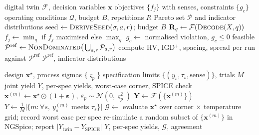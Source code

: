 \begin{algorithm}[!t]
\caption{Robust surrogate-driven multi-objective optimisation}
\label{alg:robust_surrogate_driven_multi_objective_optimisation}
\begin{algorithmic}[1]
\Require digital twin $\mathcal{F}$, decision variables $\mathbf{x}$
\Require objectives $\{f_j\}$ with senses, constraints $\{g_c\}$
\Require operating conditions $\mathcal{Q}$, budget $B$, repetitions $R$
\Ensure Pareto set $\mathcal{P}$ and indicator distributions
        \State seed $\leftarrow \textsc{DeriveSeed}(\sigma, a, r)$; budget $B$ 
                    \State $\mathbf{R}_q \leftarrow \mathcal{F}(\textsc{Decode}(X, q))$
                \EndFor
                \State $f_j \leftarrow \min_q$ if $f_j$ maximised else $\max_q$
                \State $g_c \leftarrow$ normalised violation, $g_c \le 0$ feasible
            \EndFor
        \EndWhile
    \EndFor
    \State $\mathcal{P}^{\mathrm{ref}} \leftarrow \textsc{NonDominated}\big(\bigcup_{a,r}\mathcal{P}_{a,r}\big)$
    \State compute HV, IGD$^+$, spacing, spread per run against $\mathcal{P}^{\mathrm{ref}}$
    \Return $\mathcal{P}^{\mathrm{ref}}$, indicator distributions
\end{algorithmic}
\end{algorithm}


\begin{algorithm}[!t]
\caption{Digital-twin robustness and yield estimation}
\label{alg:digital_twin_robustness_and_yield_estimation}
\begin{algorithmic}[1]
\Require design $\mathbf{x}^\star$, process sigmas $\{\varsigma_p\}$
\Require specification limits $\{(y_s, \tau_s, \text{sense})\}$, trials $M$
\Ensure joint yield $Y$, per-spec yields, worst-case corner, SPICE check
        \State $\mathbf{x}^{(m)} \leftarrow \mathbf{x}^\star \odot (1 + \boldsymbol{\varepsilon}),\ \varepsilon_p\sim\mathcal{N}(0,\varsigma_p^2)$
    \EndFor
    \State $\mathbf{Y} \leftarrow \mathcal{F}(\{\mathbf{x}^{(m)}\})$
    \State $Y \leftarrow \frac{1}{M}\big|\{m : \forall s,\ y_s^{(m)} \text{ meets } \tau_s\}\big|$
    \State $\mathcal{G} \leftarrow$ evaluate $\mathbf{x}^\star$ over corner $\times$ temperature grid; record worst case per spec
    \State re-simulate a random subset of $\{\mathbf{x}^{(m)}\}$ in NGSpice; report $|Y_{\text{twin}} - Y_{\text{SPICE}}|$
    \Return $Y$, per-spec yields, $\mathcal{G}$, agreement
\end{algorithmic}
\end{algorithm}
